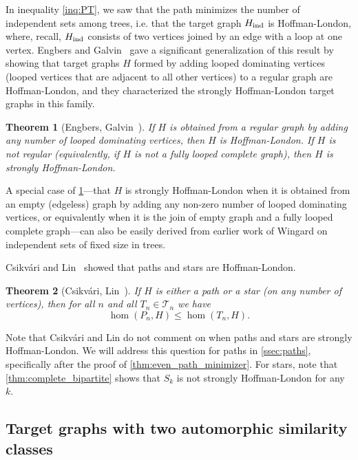 \documentclass[11pt]{article}
\newtheorem{theorem}{Theorem}[section]
\theoremstyle{definition}
\begin{document}
In inequality \eqref{inq:PT}, we saw that the path minimizes the number of independent sets among trees, i.e. that the target graph $H_{\rm ind}$ is Hoffman-London, where, recall, $H_{\rm ind}$ consists of two vertices joined by an edge with a loop at one vertex. Engbers and Galvin~\cite{EngbersGalvin2017} gave a significant generalization of this result by showing that target graphs $H$ formed by adding looped dominating vertices (looped vertices that are adjacent to all other vertices) to a regular graph are Hoffman-London, and they characterized the strongly Hoffman-London target graphs in this family.
\begin{theorem}[Engbers, Galvin~\cite{EngbersGalvin2017}] \label{thm:dom_reg}
If $H$ is obtained from a regular graph by adding any number of looped dominating vertices, then $H$ is Hoffman-London. If $H$ is not regular (equivalently, if $H$ is not a fully looped complete graph), then $H$ is strongly Hoffman-London. 
\end{theorem}

A special case of \cref{thm:dom_reg}---that $H$ is strongly Hoffman-London when it is obtained from an empty (edgeless) graph by adding any non-zero number of looped dominating vertices, or equivalently when it is the join of empty graph and a fully looped complete graph---can also be easily derived from earlier work of Wingard \cite[Theorem 5.1 and Theorem 5.2]{Wingard1995} on independent sets of fixed size in trees. 

Csikv\'ari and Lin~\cite{CsikvariLin2015} showed that paths and stars are Hoffman-London.
\begin{theorem}[Csikv\'ari, Lin~\cite{CsikvariLin2015}] \label{thm:paths_and_stars_as_H}
If $H$ is either a path or a star (on any number of vertices), then for all $n$ and all $T_n \in {\mathcal T}_n$ we have
\[\hom(P_n,H) \le \hom(T_n,H).\]
\end{theorem}
Note that Csikv\'ari and Lin do not comment on when paths and stars are strongly Hoffman-London. We will address this question for paths in \cref{ssec:paths}, specifically after the proof of \cref{thm:even_path_minimizer}. For stars, note that \cref{thm:complete_bipartite} shows that $S_k$ is not strongly Hoffman-London for any $k$.

\subsection{Target graphs with two automorphic similarity classes} \label{ssec:two_auto_classes}
\end{document}
